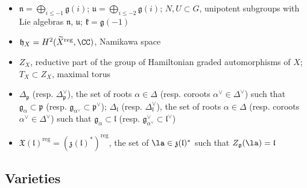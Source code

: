 \documentclass[12pt]{amsart}
\begin{document}
\begin{itemize}
       \item $\mathfrak{n}=\bigoplus_{i \leqslant -1}\mathfrak{g}(i)$; $\mathfrak{u}=\bigoplus_{i \leqslant -2}\mathfrak{g}(i)$; $N, U \subset G$, unipotent subgroups with Lie algebras $\mathfrak{n}$, $\mathfrak{u}$; $\mathfrak{k}=\mathfrak{g}(-1)$ 
       \item $\mathfrak{h}_X=H^2(\widetilde{X}^{\mathrm{reg}},\CC)$, Namikawa space
       \item $Z_X$, reductive part of the group of Hamiltonian graded automorphisms of $X$; $T_X \subset Z_X$, maximal torus 
       \item $\Delta_{\mathfrak{p}}$ (resp. $\Delta_{\mathfrak{p}}^\vee$), the set of roots $\alpha \in \Delta$ (resp. coroots $\alpha^\vee \in \Delta^\vee$) such that $\mathfrak{g}_\alpha \subset \mathfrak{p}$ (resp. $\mathfrak{g}_{\alpha^\vee} \subset \mathfrak{p}^\vee$); $\Delta_{\mathfrak{l}}$ (resp. $\Delta_{\mathfrak{l}}^\vee$), the set of roots $\alpha \in \Delta$ (resp. coroots $\alpha^\vee \in \Delta^\vee$) such that $\mathfrak{g}_{\alpha} \subset \mathfrak{l}$ (resp. $\mathfrak{g}^\vee_{\alpha^\vee} \subset \mathfrak{l}^\vee$)
       \item $\mathfrak{X}(\mathfrak{l})^{\mathrm{reg}}=(\mathfrak{z}(\mathfrak{l})^*)^{\mathrm{reg}}$, the set of $\la \in \mathfrak{z}(\mathfrak{l})^*$ such that $Z_{\mathfrak{g}}(\la)=\mathfrak{l}$
   \end{itemize}



\subsection{Varieties}
\end{document}
